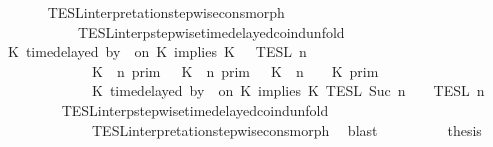 \begin{isabellebody}
\ \ \ \ \ \ \isamarkupfalse%
\ TESL{\isacharunderscore}interpretation{\isacharunderscore}stepwise{\isacharunderscore}cons{\isacharunderscore}morph\isanewline
\ \ \ \ \ \ \ \ \ \ \ \ TESL{\isacharunderscore}interp{\isacharunderscore}stepwise{\isacharunderscore}timedelayed{\isacharunderscore}coind{\isacharunderscore}unfold\isanewline
\ \ \ \ \isamarkupfalse%
\ {\isacharminus}\isanewline
\ \ \ \ \ \ \isamarkupfalse%
\ {\isacartoucheopen}{\isasymlbrakk}{\isasymlbrakk}\ {\isacharparenleft}K\ time{\isacharminus}delayed\ by\ {\isasymdelta}{\isasymtau}\ on\ K\ implies\ K\ {\isacharhash}\ {\isasymPsi}\ {\isasymrbrakk}{\isasymrbrakk}\isactrlsub T\isactrlsub E\isactrlsub S\isactrlsub L\isactrlbsup {\isasymge}\ n\isactrlesup \isanewline
\ \ \ \ \ \ \ \ \ \ \ \ {\isacharequal}\ {\isacharparenleft}{\isasymlbrakk}\ K\ {\isasymnot}{\isasymUp}\ n\ {\isasymrbrakk}\isactrlsub p\isactrlsub r\isactrlsub i\isactrlsub m\ {\isasymunion}\ {\isasymlbrakk}\ K\ {\isasymUp}\ n\ {\isasymrbrakk}\isactrlsub p\isactrlsub r\isactrlsub i\isactrlsub m\ {\isasyminter}\ {\isasymlbrakk}\ K\ {\isacharat}\ n\ {\isasymoplus}\ {\isasymdelta}{\isasymtau}\ {\isasymRightarrow}\ K\ {\isasymrbrakk}\isactrlsub p\isactrlsub r\isactrlsub i\isactrlsub m{\isacharparenright}\isanewline
\ \ \ \ \ \ \ \ \ \ \ \ {\isasyminter}\ {\isasymlbrakk}\ K\ time{\isacharminus}delayed\ by\ {\isasymdelta}{\isasymtau}\ on\ K\ implies\ K\ {\isasymrbrakk}\isactrlsub T\isactrlsub E\isactrlsub S\isactrlsub L\isactrlbsup {\isasymge}\ Suc\ n\isactrlesup \ {\isasyminter}\ {\isasymlbrakk}{\isasymlbrakk}\ {\isasymPsi}\ {\isasymrbrakk}{\isasymrbrakk}\isactrlsub T\isactrlsub E\isactrlsub S\isactrlsub L\isactrlbsup {\isasymge}\ n\isactrlesup {\isacartoucheclose}\isanewline
\ \ \ \ \ \ \ \ \isamarkupfalse%
\ TESL{\isacharunderscore}interp{\isacharunderscore}stepwise{\isacharunderscore}timedelayed{\isacharunderscore}coind{\isacharunderscore}unfold\isanewline
\ \ \ \ \ \ \ \ \ \ \ \ \ \ TESL{\isacharunderscore}interpretation{\isacharunderscore}stepwise{\isacharunderscore}cons{\isacharunderscore}morph\ \isamarkupfalse%
\ blast\isanewline
\ \ \ \ \ \ \isamarkupfalse%
\ \isamarkupfalse%
\ {\isacharquery}thesis\isanewline
\ \ \ \ \ \ \ \ \isamarkupfalse%

\end{isabellebody}

